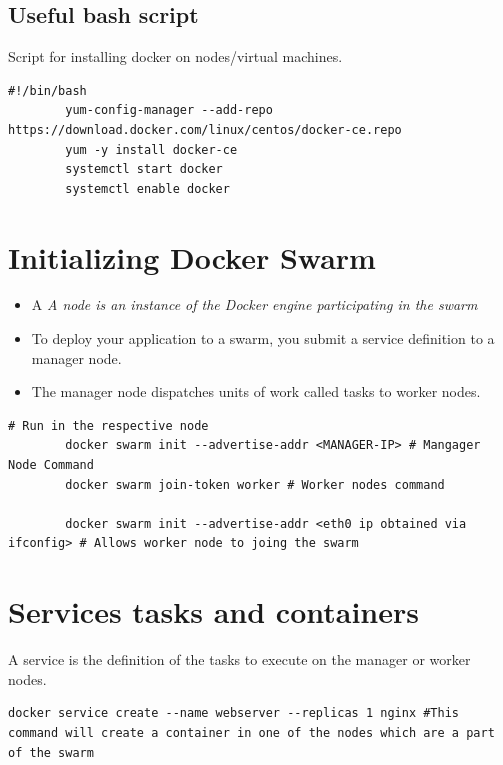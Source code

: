 \documentclass[11pt]{book}
\begin{document}
    \subsection{Useful bash script}
    Script for installing docker on nodes/virtual machines.
    \begin{lstlisting}[style=terminal]
        #!/bin/bash
        yum-config-manager --add-repo https://download.docker.com/linux/centos/docker-ce.repo
        yum -y install docker-ce
        systemctl start docker
        systemctl enable docker
    \end{lstlisting}
    
    \section{Initializing Docker Swarm}
    \begin{itemize}
        \item A \textit{A node is an instance of the Docker engine participating in the swarm}
        \item To deploy your application to a swarm, you submit a service definition to a manager node.
        \item The manager node dispatches units of work called tasks to worker nodes.
    \end{itemize}

    \begin{lstlisting}[style=terminal]
        # Run in the respective node
        docker swarm init --advertise-addr <MANAGER-IP> # Mangager Node Command
        docker swarm join-token worker # Worker nodes command

        docker swarm init --advertise-addr <eth0 ip obtained via ifconfig> # Allows worker node to joing the swarm
    \end{lstlisting}

    \section{Services tasks and containers}
    A service is the definition of the tasks to execute on the manager or worker nodes.

    \begin{lstlisting}[style=terminal]
        docker service create --name webserver --replicas 1 nginx #This command will create a container in one of the nodes which are a part of the swarm
    \end{lstlisting}
    
\end{document}
